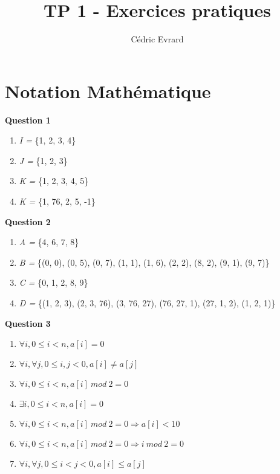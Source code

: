 \documentclass[11pt]{article}
\title{TP 1 - Exercices pratiques}
\author{Cédric Evrard}
\begin{document}
\maketitle

\section{Notation Mathématique}

\textbf{Question 1}
\begin{enumerate}
	\item \textit{I =} \{1, 2, 3, 4\}
	\item \textit{J =} \{1, 2, 3\} 
	\item \textit{K =} \{1, 2, 3, 4, 5\}
	\item \textit{K =} \{1, 76, 2, 5, -1\} 
\end{enumerate}

\textbf{Question 2}
\begin{enumerate}
	\item \textit{A =} \{4, 6, 7, 8\}
	\item \textit{B =} \{(0, 0), (0, 5), (0, 7), (1, 1), (1, 6), (2, 2), (8, 2), (9, 1), (9, 7)\}
	\item \textit{C =} \{0, 1, 2, 8, 9\}
	\item \textit{D =} \{(1, 2, 3), (2, 3, 76), (3, 76, 27), (76, 27, 1), (27, 1, 2), (1, 2, 1)\}
\end{enumerate}

\textbf{Question 3}
\begin{enumerate}
	\item $\forall i, 0 \leq i < n, a[i] = 0$
	\item $\forall i, \forall j, 0 \leq i, j < 0, a[i] \neq a[j]$
	\item $\forall i, 0 \leq i < n, a[i]\ mod\ 2 = 0$
	\item $\exists i, 0 \leq i < n, a[i] = 0$
	\item $\forall i, 0 \leq i < n, a[i]\ mod\ 2 = 0 \Rightarrow a[i] < 10  $
	\item $\forall i, 0 \leq i < n, a[i]\ mod\ 2 = 0 \Rightarrow i\ mod\ 2 = 0$
	\item $\forall i, \forall j, 0 \leq i < j < 0, a[i] \leq a[j]$
\end{enumerate}
\end{document}
